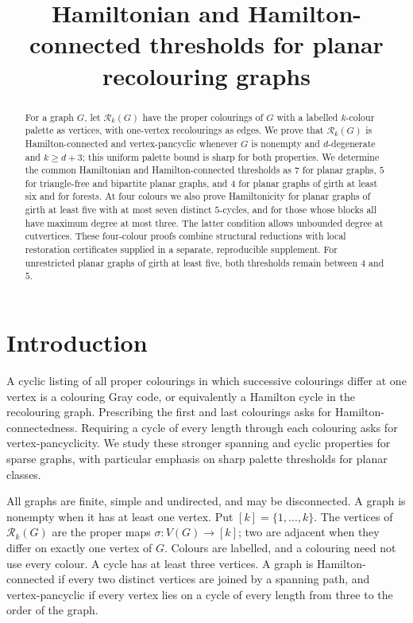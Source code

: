 \documentclass[11pt]{article}
\title{Hamiltonian and Hamilton-connected thresholds for planar recolouring graphs}
\author{}
\date{}
\theoremstyle{remark}
\newcommand{\Rk}{\mathcal R_k}
\numberwithin{equation}{section}
\numberwithin{table}{section}
\begin{document}
\maketitle

\begin{abstract}
For a graph $G$, let $\Rk(G)$ have the proper colourings of $G$ with a
labelled $k$-colour palette as vertices, with one-vertex recolourings as
edges. We prove that $\Rk(G)$ is Hamilton-connected and vertex-pancyclic
whenever $G$ is nonempty and $d$-degenerate and $k\ge d+3$; this uniform
palette bound is sharp for both properties. We determine the common
Hamiltonian and Hamilton-connected thresholds as $7$ for planar graphs,
$5$ for triangle-free and bipartite planar graphs, and $4$ for planar
graphs of girth at least six and for forests. At four colours we also
prove Hamiltonicity for planar graphs of girth at least five with at
most seven distinct $5$-cycles, and for those whose blocks all have
maximum degree at most three. The latter condition allows unbounded
degree at cutvertices. These four-colour proofs combine structural
reductions with local restoration certificates supplied in a separate,
reproducible supplement. For unrestricted planar graphs of girth at
least five, both thresholds remain between $4$ and $5$.
\end{abstract}

\section{Introduction}

A cyclic listing of all proper colourings in which successive colourings
differ at one vertex is a colouring Gray code, or equivalently a Hamilton
cycle in the recolouring graph. Prescribing the first and last
colourings asks for Hamilton-connectedness. Requiring a cycle of every
length through each colouring asks for vertex-pancyclicity. We study
these stronger spanning and cyclic properties for sparse graphs, with
particular emphasis on sharp palette thresholds for planar classes.

All graphs are finite, simple and undirected, and may be disconnected.
A graph is nonempty when it has at least one vertex. Put $[k]=\{1,\ldots,k\}$.
The vertices of $\Rk(G)$ are the proper maps $\sigma:V(G)\to[k]$;
two are adjacent when they differ on exactly one vertex of $G$.
Colours are labelled, and a colouring need not use every colour.
A cycle has at least three vertices. A graph is Hamilton-connected if
every two distinct vertices are joined by a spanning path, and
vertex-pancyclic if every vertex lies on a cycle of every length from
three to the order of the graph.
\end{document}
